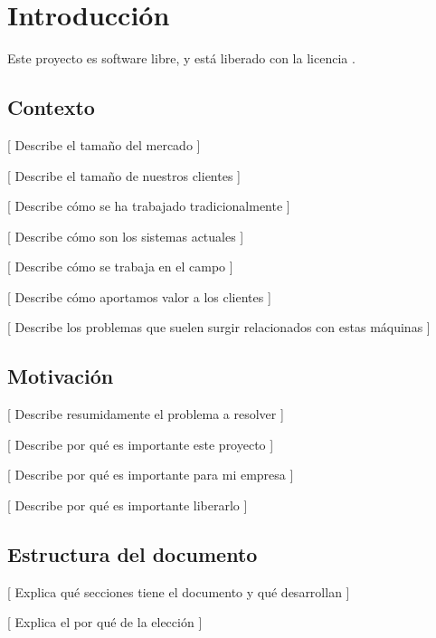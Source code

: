 \chapter{Introducción}

Este proyecto es software libre, y está liberado con
la licencia \cite{agplv3}.

\section{Contexto}

[ Describe el tamaño del mercado ]

[ Describe el tamaño de nuestros clientes ]

[ Describe cómo se ha trabajado tradicionalmente ]

[ Describe cómo son los sistemas actuales ]

[ Describe cómo se trabaja en el campo ]

[ Describe cómo aportamos valor a los clientes ]

[ Describe los problemas que suelen surgir relacionados
con estas máquinas ]

\section{Motivación}

[ Describe resumidamente el problema a resolver ]

[ Describe por qué es importante este proyecto ]

[ Describe por qué es importante para mi empresa ]

[ Describe por qué es importante liberarlo ]

\section{Estructura del documento}

[ Explica qué secciones tiene el documento y qué desarrollan ]

[ Explica el por qué de la elección ]
